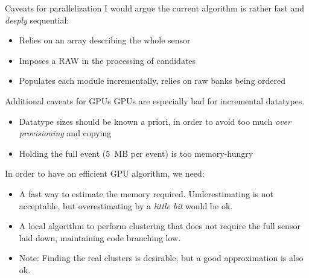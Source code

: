 \begin{frame}{Caveats for parallelization}
I would argue the current algorithm is rather fast and \emph{deeply} sequential:

\begin{itemize}
\item Relies on an array describing the whole sensor
\item Imposes a RAW in the processing of candidates
\item Populates each module incrementally, relies on raw banks being ordered
\end{itemize}
\end{frame}

\begin{frame}{Additional caveats for GPUs}
GPUs are especially bad for incremental datatypes.

\begin{itemize}
\item Datatype sizes should be known a priori, in order to avoid too much \emph{over provisioning} and copying
\item Holding the full event (5~MB per event) is too memory-hungry
\end{itemize}

In order to have an efficient GPU algorithm, we need:

\begin{itemize}
\item A fast way to estimate the memory required. Underestimating is not acceptable, but overestimating by a \emph{little bit} would be ok.
\item A local algorithm to perform clustering that does not require the full sensor laid down, maintaining code branching low.
\item Note: Finding the real clusters is desirable, but a good approximation is also ok.
\end{itemize}
\end{frame}
